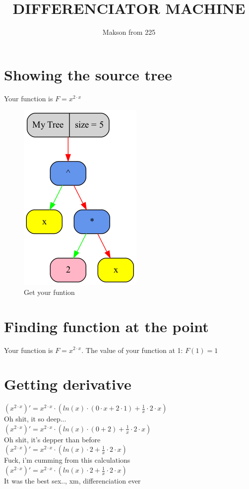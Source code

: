 \documentclass[12pt, letterpaper, twoside]{article}
\title{DIFFERENCIATOR MACHINE}
\author{Makson from 225}
\date{}
\begin{document}
\maketitle
\newpage
\section{Showing the source tree}
\begin{center}
Your function is $F = x^{2 \cdot x}$\newline 
\begin{figure}
\begin{center}
\includegraphics [scale = 0.4]{graphics/graph1.png}
\caption{Get your funtion}
\end{center}
\end{figure}
\end{center}
\newpage
\section{Finding function at the point}
\begin{center}
Your function is $F = x^{2 \cdot x}$.
The value of your function at 1: $ F(1) = 1 $
\end{center}
\newpage
\section{Getting derivative}
\begin{center}
$(x^{2 \cdot x})' = x^{2 \cdot x} \cdot (ln(x) \cdot (0 \cdot x + 2 \cdot 1) + \frac{1}{x}  \cdot 2 \cdot x)$\\
Oh shit, it so deep...\\
$(x^{2 \cdot x})' = x^{2 \cdot x} \cdot (ln(x) \cdot (0 + 2) + \frac{1}{x}  \cdot 2 \cdot x)$\\
Oh shit, it's depper than before\\
$(x^{2 \cdot x})' = x^{2 \cdot x} \cdot (ln(x) \cdot 2 + \frac{1}{x}  \cdot 2 \cdot x)$\\
Fuck, i'm cumming from this calculations\\
$(x^{2 \cdot x})' = x^{2 \cdot x} \cdot (ln(x) \cdot 2 + \frac{1}{x}  \cdot 2 \cdot x)$\\
It was the best sex.., xm, differenciation ever
\end{center}
\newpage
\end{document}
